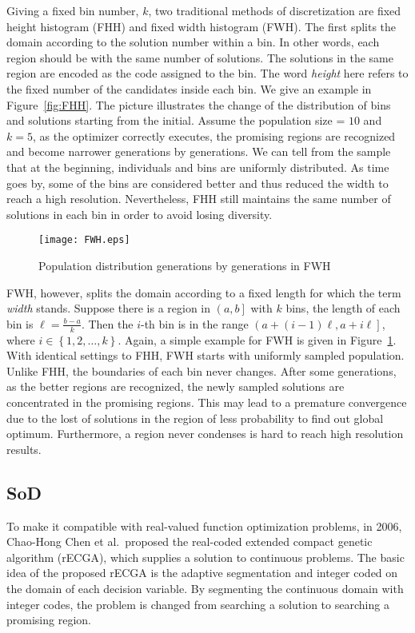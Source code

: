 Giving a fixed bin number, $k$, two traditional methods of
discretization are fixed height histogram (FHH) and fixed width
histogram (FWH).
The first splits the domain according to the solution number within a
bin.
In other words, each region should be with the same number of solutions.
The solutions in the same region are encoded as the code assigned to the
bin.
The word \textit{height} here refers to the fixed number of the
candidates inside each bin.
We give an example in Figure~\ref{fig:FHH}.
The picture illustrates the change of the distribution of bins and
solutions starting from the initial.
Assume the population size = $10$ and $k = 5$, as the optimizer
correctly executes, the promising regions are recognized and become
narrower generations by generations.
We can tell from the sample that at the beginning, individuals and bins
are uniformly distributed.
As time goes by, some of the bins are considered better and thus reduced
the width to reach a high resolution.
Nevertheless, FHH still maintains the same number of solutions in each
bin in order to avoid losing diversity. \\
\begin{figure}[h] \begin{center}
    \texttt{[image: FWH.eps]}
    \caption{Population distribution generations by generations in FWH}
    \label{fig:FWH} 
  \end{center} 
\end{figure}
FWH, however, splits the domain according to a fixed length for which
the term \textit{width} stands.
Suppose there is a region in $\left(a,b\right]$ with $k$ bins, the
length of each bin is $\ell = \frac{b-a}{k}$.
Then the $i$-th bin is in the range $\left(a + (i-1)\ell ,
a+i\ell\right]$, where $i \in \left\{ 1,2,\ldots, k\right\}$.
Again, a simple example for FWH is given in Figure~\ref{fig:FWH}.
With identical settings to FHH, FWH starts with uniformly sampled
population.
Unlike FHH, the boundaries of each bin never changes.
After some generations, as the better regions are recognized, the newly
sampled solutions are concentrated in the promising regions. 
This may lead to a premature convergence due to the lost of solutions in
the region of less probability to find out global optimum.
Furthermore, a region never condenses is hard to reach high resolution
results.

\subsection{SoD} \label{sec:SoD} To make it compatible with real-valued
function optimization problems, in 2006, Chao-Hong Chen et al.\ proposed
the real-coded extended compact genetic algorithm (rECGA), which
supplies a solution to continuous problems.  The basic idea of the
proposed rECGA is the adaptive segmentation and integer coded on the
domain of each decision variable.  By segmenting the continuous domain
with integer codes, the problem is changed from searching a solution to
searching a promising region.

